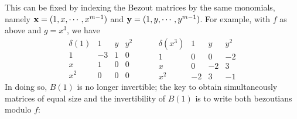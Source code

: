 \documentclass{standalone}
\begin{document}
This can be fixed by indexing the Bezout matrices by the same monomials, namely $\bold{x} = (1, x,\cdots, x^{m-1})$ and $\bold{y} = (1, y,\cdots, y^{m-1})$. 
For example, with $f$ as above and $g = x^3$, we have
$$
\begin{array}{c|ccc}
\delta(1) & 1 & y & y^2\\
\hline
1 & -3 & 1 & 0\\
x & 1 & 0 & 0\\
x^2 & 0 & 0 & 0
\end{array}
\hspace{1cm}
\begin{array}{c|ccc}
\delta(x^3) & 1 & y & y^2\\
\hline
1 & 0 & 0 & -2\\
x & 0 & -2 & 3\\
x^2 & -2 & 3 & -1
\end{array}
$$
In doing so, $B(1)$ is no longer invertible; the key to obtain simultaneously matrices of equal size and the invertibility of $B(1)$ is to write both bezoutians modulo $f$:
\end{document}
